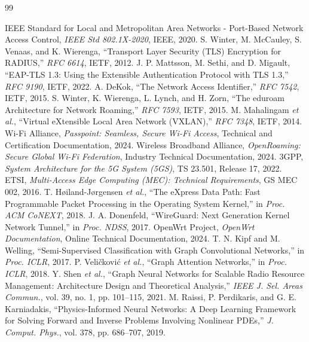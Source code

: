\begin{thebibliography}{99}

 IEEE Standard for Local and Metropolitan Area Networks - Port-Based Network Access Control, \textit{IEEE Std 802.1X-2020}, IEEE, 2020.
 S. Winter, M. McCauley, S. Venaas, and K. Wierenga, ``Transport Layer Security (TLS) Encryption for RADIUS,'' \textit{RFC 6614}, IETF, 2012.
 J. P. Mattsson, M. Sethi, and D. Migault, ``EAP-TLS 1.3: Using the Extensible Authentication Protocol with TLS 1.3,'' \textit{RFC 9190}, IETF, 2022.
 A. DeKok, ``The Network Access Identifier,'' \textit{RFC 7542}, IETF, 2015.
 S. Winter, K. Wierenga, L. Lynch, and H. Zorn, ``The eduroam Architecture for Network Roaming,'' \textit{RFC 7593}, IETF, 2015.
 M. Mahalingam \textit{et al.}, ``Virtual eXtensible Local Area Network (VXLAN),'' \textit{RFC 7348}, IETF, 2014.
 Wi-Fi Alliance, \textit{Passpoint: Seamless, Secure Wi-Fi Access}, Technical and Certification Documentation, 2024.
 Wireless Broadband Alliance, \textit{OpenRoaming: Secure Global Wi-Fi Federation}, Industry Technical Documentation, 2024.
 3GPP, \textit{System Architecture for the 5G System (5GS)}, TS 23.501, Release 17, 2022.
 ETSI, \textit{Multi-Access Edge Computing (MEC): Technical Requirements}, GS MEC 002, 2016.
 T. Høiland-Jørgensen \textit{et al.}, ``The eXpress Data Path: Fast Programmable Packet Processing in the Operating System Kernel,'' in \textit{Proc. ACM CoNEXT}, 2018.
 J. A. Donenfeld, ``WireGuard: Next Generation Kernel Network Tunnel,'' in \textit{Proc. NDSS}, 2017.
 OpenWrt Project, \textit{OpenWrt Documentation}, Online Technical Documentation, 2024.
 T. N. Kipf and M. Welling, ``Semi-Supervised Classification with Graph Convolutional Networks,'' in \textit{Proc. ICLR}, 2017.
 P. Veličković \textit{et al.}, ``Graph Attention Networks,'' in \textit{Proc. ICLR}, 2018.
 Y. Shen \textit{et al.}, ``Graph Neural Networks for Scalable Radio Resource Management: Architecture Design and Theoretical Analysis,'' \textit{IEEE J. Sel. Areas Commun.}, vol. 39, no. 1, pp. 101--115, 2021.
 M. Raissi, P. Perdikaris, and G. E. Karniadakis, ``Physics-Informed Neural Networks: A Deep Learning Framework for Solving Forward and Inverse Problems Involving Nonlinear PDEs,'' \textit{J. Comput. Phys.}, vol. 378, pp. 686--707, 2019.

\end{thebibliography}

